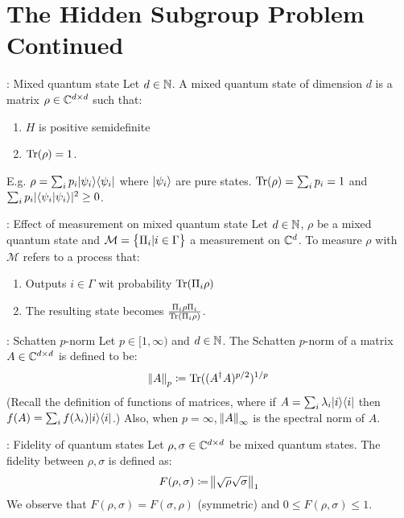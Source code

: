 \section{The Hidden Subgroup Problem Continued}

\begin{defbox}{: Mixed quantum state}
    Let $d \in \mathbb{N}$. A mixed quantum state of dimension $d$ is a matrix $\rho \in \mathbb{C}^{d \times d}$ such that:
    \begin{enumerate}
        \item $H$ is positive semidefinite
        \item $\mathrm{Tr}(\rho) = 1$.
    \end{enumerate}
    E.g. $\rho = \sum_i p_i \lvert \psi_i \rangle \langle \psi_i \rvert$ where $\lvert \psi_i \rangle$ are pure states. $\mathrm{Tr}(\rho) = \sum_i p_i = 1$ and $\sum_i p_i \lvert \langle \psi_i \lvert \psi_i \rangle \rvert^2 \geq 0$. 
\end{defbox}

\begin{defbox}{: Effect of measurement on mixed quantum state}
    Let $d \in \mathbb{N}$, $\rho$ be a mixed quantum state and $\mathcal{M} = \set{\Pi_i \vert i \in \Gamma}$ a measurement on $\mathbb{C}^d$. To measure $\rho$ with $\mathcal{M}$ refers to a process that:
    \begin{enumerate}
        \item Outputs $i \in \Gamma$ wit probability $\mathrm{Tr}(\Pi_i \rho)$
        \item The resulting state becomes $\frac{\Pi_i \rho\Pi_i}{\mathrm{Tr}(\Pi_i \rho)}$. 
    \end{enumerate}
\end{defbox}

\begin{defbox}{: Schatten $p$-norm}
    Let $p \in [1, \infty)$ and $d \in \mathbb{N}$. The Schatten $p$-norm of a matrix $A \in \mathbb{C}^{d \times d}$ is defined to be:
    \begin{equation}
        \norm{A}_p \coloneqq \mathrm{Tr}((A^\dagger A)^{p/2})^{1/p}
    \end{equation}
    (Recall the definition of functions of matrices, where if $A = \sum_i \lambda_i \lvert i \rangle \langle i \rvert$ then $f(A) = \sum_i f(\lambda_i)\lvert i \rangle \langle i \rvert$.) Also, when $p = \infty$, $\norm{A}_\infty$ is the spectral norm of $A$. 
\end{defbox}

\begin{defbox}{: Fidelity of quantum states}
    Let $\rho, \sigma \in \mathbb{C}^{d \times d}$ be mixed quantum states. The fidelity between $\rho, \sigma$ is defined as:
    \begin{equation}
        F(\rho, \sigma) \coloneqq \norm{\sqrt{\rho}\sqrt{\sigma}}_1
    \end{equation}
    We observe that $F(\rho, \sigma) = F(\sigma, \rho)$ (symmetric) and $0 \leq F(\rho, \sigma) \leq 1$.
\end{defbox}

